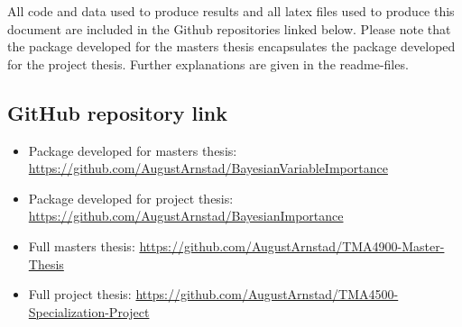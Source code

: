 All code and data used to produce results and all latex files used to produce this document are included in the Github repositories linked below. Please note that the package developed for the masters thesis encapsulates the package developed for the project thesis. Further explanations are given in the readme-files. 
\subsection*{GitHub repository link}
\begin{itemize}
    \item Package developed for masters thesis: \url{https://github.com/AugustArnstad/BayesianVariableImportance}
    \item Package developed for project thesis: \url{https://github.com/AugustArnstad/BayesianImportance}
    \item Full masters thesis: \url{https://github.com/AugustArnstad/TMA4900-Master-Thesis}
    \item Full project thesis: \url{https://github.com/AugustArnstad/TMA4500-Specialization-Project}
\end{itemize}
